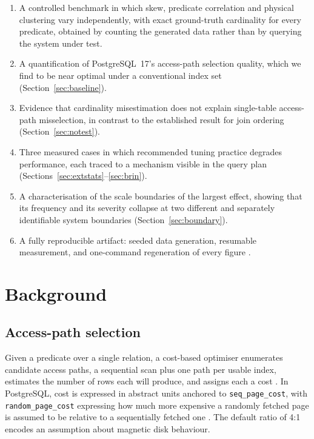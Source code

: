 \documentclass[preprint,12pt,authoryear]{elsarticle}
\newcommand{\rpc}{\texttt{random\_page\_cost}}
\begin{document}
\begin{enumerate}
\item A controlled benchmark in which skew, predicate correlation and
  physical clustering vary independently, with exact ground-truth
  cardinality for every predicate, obtained by counting the generated
  data rather than by querying the system under test.
\item A quantification of PostgreSQL~17's access-path selection
  quality, which we find to be near optimal under a conventional index
  set (Section~\ref{sec:baseline}).
\item Evidence that cardinality misestimation does not explain
  single-table access-path misselection, in contrast to the established
  result for join ordering \citep{leis2015good}
  (Section~\ref{sec:notest}).
\item Three measured cases in which recommended tuning practice
  degrades performance, each traced to a mechanism visible in the query
  plan (Sections~\ref{sec:extstats}--\ref{sec:brin}).
\item A characterisation of the scale boundaries of the largest effect,
  showing that its frequency and its severity collapse at two different
  and separately identifiable system boundaries
  (Section~\ref{sec:boundary}).
\item A fully reproducible artifact: seeded data generation, resumable
  measurement, and one-command regeneration of every figure
  \citep{artifact2026}.
\end{enumerate}

\section{Background}
\label{sec:background}

\subsection{Access-path selection}

Given a predicate over a single relation, a cost-based optimiser
enumerates candidate access paths, a sequential scan plus one path per
usable index, estimates the number of rows each will produce, and
assigns each a cost \citep{selinger1979access,chaudhuri1998overview,graefe1993query}.
In PostgreSQL, cost is expressed in abstract units anchored to
\texttt{seq\_page\_cost}, with \rpc{} expressing how much more expensive
a randomly fetched page is assumed to be relative to a sequentially
fetched one \citep{pgdocs17indexcost}. The default ratio of 4:1 encodes
an assumption about magnetic disk behaviour.
\end{document}
